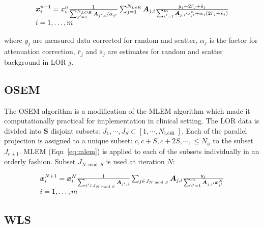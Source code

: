 \begin{equation}
\begin{array}{l}
\bm{x}_{i}^{n+1}=x_{i}^{n} \frac{1}{\sum_{j^{\prime}=1}^{N_{L O R}} \bm{A}_{j^{\prime}, i} / \alpha_{j^{\prime}}} \sum_{j=1}^{N_{L o R}} \bm{A}_{j, i} \frac{y_{j}+2 \bar{r}_{j}+\bar{s}_{j}}{\sum_{i^{\prime}=1}^{m} \bm{A}_{j, i^{\prime}} x_{i^{\prime}}^{n}+\alpha_{j}\left(2 \bar{r}_{j}+\bar{s}_{j}\right)} \\
i=1, \ldots, m
\end{array}
\end{equation}

where $y_j$ are measured data corrected for random and scatter, $\alpha_{j}$ is the factor for attenuation correction, $\bar{r}_{j}$ and $\bar{s}_{j}$ are estimates for random and scatter background in \ac{LOR} $j$. 



\subsection{OSEM}

The \ac{OSEM} algorithm is a modification of the \ac{MLEM} algorithm which made it computationally practical for implementation in clinical setting. The \ac{LOR} data is divided into $\bm{S}$ disjoint subsets: $J_{1}, \cdots, J_{S} \subset\left[1, \cdots, N_{\text {LOR }}\right]$. Each of the parallel projection is assigned to a unique subset: $c, c+S, c+2S, \cdots, \leq N_{\phi}$ to the subset $J_{c+1}$. \ac{MLEM} (Eqn~\ref{eq:mlem}) is applied to each of the subsets individually in an orderly fashion. Subset $J_{N\bmod S}$ is used at iteration $N$:

\begin{equation}
\begin{array}{l}
\bm{x}_{i}^{N+1}=\bm{x}_{i}^{N} \frac{1}{\sum_{j^{\prime} \in J_{N \bmod S}} \bm{A}_{j^{\prime}, i}} \sum_{j \in J_{N \bmod S}} \bm{A}_{j, i} \frac{y_{j}}{\sum_{i^{\prime}=1}^{m} \bm{A}_{j, i^{\prime}} \bm{x}_{i^{\prime}}^{N}} \\
i=1, \ldots, m
\end{array}
\end{equation}  




\subsection{\ac{WLS}}

